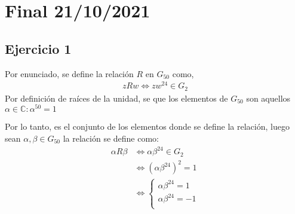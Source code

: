 
\usepackage{caratula}
\usepackage{enumerate}
\usepackage{hyperref}
\usepackage{graphicx}
\usepackage{amsfonts}
\usepackage{enumitem}
\usepackage{amsmath}

\decimalpoint
\hypersetup{colorlinks=true, linkcolor=black, urlcolor=blue}
\setlength{\parindent}{0em}
\setlength{\parskip}{0.5em}
\setcounter{tocdepth}{3} %
\setcounter{section}{0} %
\renewcommand{\thesubsubsection}{\thesubsection.\Alph{subsubsection}}
\graphicspath{ {images/} }





\maketitle
\newpage

\tableofcontents
\newpage

\section{Final 21/10/2021}

\subsection{Ejercicio 1}

Por enunciado, se define la relación $R$ en $G_{50}$ como,
\begin{align*}
    zRw \iff zw^{24} \in G_2
\end{align*}
Por definición de raíces de la unidad, se que los elementos de $G_{50}$ son aquellos $ \alpha \in \mathbb{C}: \alpha^{50} = 1 $

Por lo tanto, es el conjunto de los elementos donde se define la relación, luego sean $ \alpha, \beta \in G_{50} $ la relación se define como:
\begin{align*}
    \alpha R\beta &\iff \alpha \beta^{24} \in G_2 \\
    &\iff (\alpha \beta^{24})^2 = 1 \\
    &\iff \begin{cases}
        \alpha \beta^{24} = 1 \\
        \alpha \beta^{24} = -1 \\
    \end{cases} \\
\end{align*}

